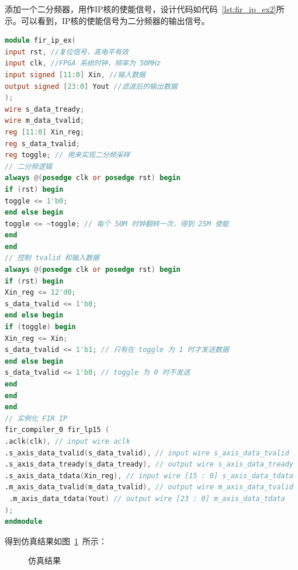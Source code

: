 添加一个二分频器，用作IP核的使能信号，设计代码如代码~\ref{lst:fir_ip_ex2}所示。可以看到，IP核的使能信号为二分频器的输出信号。
\begin{lstlisting}[language=verilog,caption={基于IP核的半串行结构的FIR滤波器},label=lst:fir_ip_ex2]
module fir_ip_ex(
input rst, //复位信号，高电平有效
input clk, //FPGA 系统时钟，频率为 50MHz
input signed [11:0] Xin, //输入数据
output signed [23:0] Yout //滤波后的输出数据
);
wire s_data_tready;
wire m_data_tvalid;
reg [11:0] Xin_reg;
reg s_data_tvalid;
reg toggle; // 用来实现二分频采样
// 二分频逻辑
always @(posedge clk or posedge rst) begin
if (rst) begin
toggle <= 1'b0;
end else begin
toggle <= ~toggle; // 每个 50M 时钟翻转一次，得到 25M 使能
end
end
// 控制 tvalid 和输入数据
always @(posedge clk or posedge rst) begin
if (rst) begin
Xin_reg <= 12'd0;
s_data_tvalid <= 1'b0;
end else begin
if (toggle) begin
Xin_reg <= Xin;
s_data_tvalid <= 1'b1; // 只有在 toggle 为 1 时才发送数据
end else begin
s_data_tvalid <= 1'b0; // toggle 为 0 时不发送
end
end
end
// 实例化 FIR IP
fir_compiler_0 fir_lp15 (
.aclk(clk), // input wire aclk
.s_axis_data_tvalid(s_data_tvalid), // input wire s_axis_data_tvalid
.s_axis_data_tready(s_data_tready), // output wire s_axis_data_tready
.s_axis_data_tdata(Xin_reg), // input wire [15 : 0] s_axis_data_tdata
.m_axis_data_tvalid(m_data_tvalid), // output wire m_axis_data_tvalid
 .m_axis_data_tdata(Yout) // output wire [23 : 0] m_axis_data_tdata
);
endmodule
\end{lstlisting}

得到仿真结果如图~\ref{fig:exp7:sim_result2}~所示：
\begin{figure}[htbp]
    \centering
    \hfill
    \caption{仿真结果} 
    \label{fig:exp7:sim_result2}
\end{figure}

